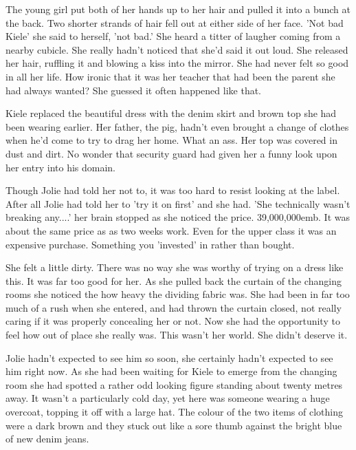 The young girl put both of her hands up to her hair and pulled it into a bunch at the back.  Two shorter strands of hair fell out at either side of her face.  'Not bad Kiele' she said to herself, 'not bad.'  She heard a titter of laugher coming from a nearby cubicle.  She really hadn't noticed that she'd said it out loud.  She released her hair, ruffling it and blowing a kiss into the mirror.  She had never felt so good in all her life.  How ironic that it was her teacher that had been the parent she had always wanted?  She guessed it often happened like that.  

Kiele replaced the beautiful dress with the denim skirt and brown top she had been wearing earlier.  Her father, the pig, hadn't even brought a change of clothes when he'd come to try to drag her home.  What an ass.  Her top was covered in dust and dirt.  No wonder that security guard had given her a funny look upon her entry into his domain.

Though Jolie had told her not to, it was too hard to resist looking at the label.  After all Jolie had told her to 'try it on first' and she had.  'She technically wasn't breaking any....' her brain stopped as she noticed the price.  39,000,000emb.  It was about the same price as as two weeks work.  Even for the upper class it was an expensive purchase.  Something you 'invested' in rather than bought.  

She felt a little dirty.  There was no way she was worthy of trying on a dress like this.  It was far too good for her.  As she pulled back the curtain of the changing rooms she noticed the how heavy the dividing fabric was.  She had been in far too much of a rush when she entered, and had thrown the curtain closed, not really caring if it was properly concealing her or not.  Now she had the opportunity to feel how out of place she really was.  This wasn't her world.  She didn't deserve it.  



\thoughtbreak



Jolie hadn't expected to see him so soon, she certainly hadn't expected to see him right now.  As she had been waiting for Kiele to emerge from the changing room she had spotted a rather odd looking figure standing about twenty metres away.  It wasn't a particularly cold day, yet here was someone wearing a huge overcoat, topping it off with a large hat.  The colour of the two items of clothing were a dark brown and they stuck out like a sore thumb against the bright blue of new denim jeans.

